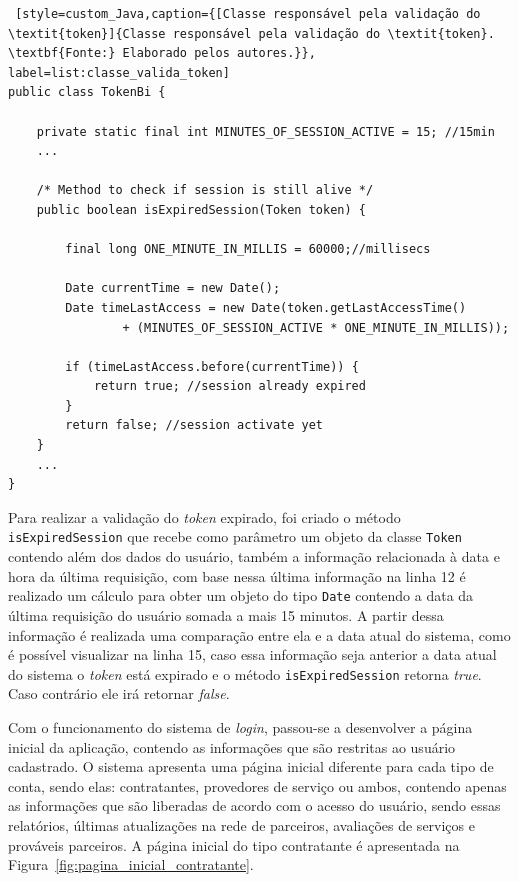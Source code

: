 \begin{lstlisting} [style=custom_Java,caption={[Classe responsável pela validação do \textit{token}]{Classe responsável pela validação do \textit{token}. \textbf{Fonte:} Elaborado pelos autores.}}, label=list:classe_valida_token]
public class TokenBi {
	
	private static final int MINUTES_OF_SESSION_ACTIVE = 15; //15min
	...
	
	/* Method to check if session is still alive */
	public boolean isExpiredSession(Token token) {
		
		final long ONE_MINUTE_IN_MILLIS = 60000;//millisecs
		
		Date currentTime = new Date();
		Date timeLastAccess = new Date(token.getLastAccessTime() 
				+ (MINUTES_OF_SESSION_ACTIVE * ONE_MINUTE_IN_MILLIS));
		
		if (timeLastAccess.before(currentTime)) {
			return true; //session already expired
		}
		return false; //session activate yet
	}
	...
}
\end{lstlisting}

Para realizar a validação do \textit{token} expirado, foi criado o método \texttt{isExpiredSession} que  recebe como parâmetro um objeto da classe \texttt{Token} contendo além dos dados do usuário, também a informação relacionada à data e hora da última requisição, com base nessa última informação na linha 12 é realizado um cálculo para obter um objeto do tipo \texttt{Date} contendo a data da última requisição do usuário somada a mais 15 minutos. A partir dessa informação é realizada uma comparação entre ela e a data atual do sistema, como é possível visualizar na linha 15, caso essa informação seja anterior a data atual do sistema o \textit{token} está expirado e o método \texttt{isExpiredSession} retorna \textit{true}. Caso contrário ele irá retornar \textit{false}.

\par Com o funcionamento do sistema de \textit{login}, passou-se a desenvolver a página inicial da aplicação, contendo as informações que são restritas ao usuário cadastrado. O sistema apresenta uma página inicial diferente para cada tipo de conta, sendo elas: contratantes, provedores de serviço ou ambos, contendo apenas as informações que são liberadas de acordo com o acesso do usuário, sendo essas relatórios, últimas atualizações na rede de parceiros, avaliações de serviços e prováveis parceiros. A página inicial do tipo contratante é apresentada na Figura~\ref{fig:pagina_inicial_contratante}.


